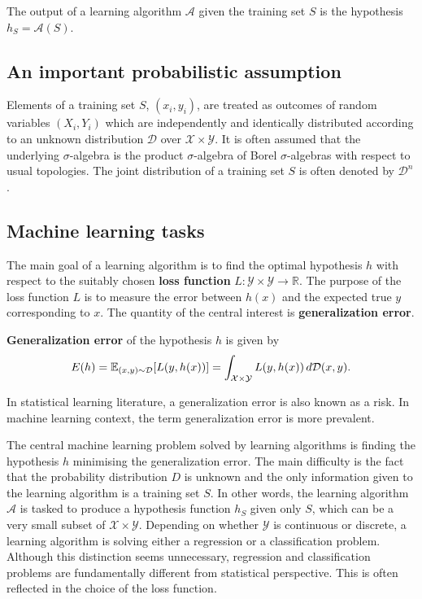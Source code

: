 \begin{remark}
The output of a learning algorithm $\mathcal{A}$ given the training set $S$ is the hypothesis $h_S = \mathcal{A}(S)$.
\end{remark}

\subsection{An important probabilistic assumption}

Elements of a training set $S$, $(x_i, y_i)$, are treated as outcomes of random variables $(X_i, Y_i)$ which are independently and identically distributed according to an unknown distribution $\mathcal{D}$ over $\mathcal{X} \times \mathcal{Y}$. It is often assumed that the underlying $\sigma$-algebra is the product $\sigma$-algebra of Borel $\sigma$-algebras with respect to usual topologies. The joint distribution of a training set $S$ is often denoted by $\mathcal{D}^n$.

\subsection{Machine learning tasks}

The main goal of a learning algorithm is to find the optimal hypothesis $h$ with respect to the suitably chosen \textbf{loss function} $L : \mathcal{Y} \times \mathcal{Y} \to \mathbb{R}$. The purpose of the loss function $L$ is to measure the error between $h(x)$ and the expected true $y$ corresponding to $x$. The quantity of the central interest is \textbf{generalization error}.

\begin{definition}
\textbf{Generalization error} of the hypothesis $h$ is given by
\begin{equation*}
    E (h) = \mathbb{E}_{(x, y) \sim \mathcal{D}} [ L(y, h(x)) ] = \int_{\mathcal{X} \times \mathcal{Y}} L (y, h(x))  \,d\mathcal{D}(x, y)\\.
\end{equation*}
\end{definition}
\begin{remark}
In statistical learning literature, a generalization error is also known as a risk. In machine learning context, the term generalization error is more prevalent.
\end{remark}

The central machine learning problem solved by learning algorithms is finding the hypothesis $h$ minimising the generalization error.
The main difficulty is the fact that the probability distribution $D$ is unknown and the only information given to the learning algorithm is a training set $S$. In other words, the learning algorithm $\mathcal{A}$ is tasked to produce a hypothesis function $h_S$ given only $S$, which can be a very small subset of $\mathcal{X} \times \mathcal{Y}$. Depending on whether $\mathcal{Y}$ is continuous or discrete, a learning algorithm is solving either a regression or a classification problem. Although this distinction seems unnecessary, regression and classification problems are fundamentally different from statistical perspective. This is often reflected in the choice of the loss function. 

